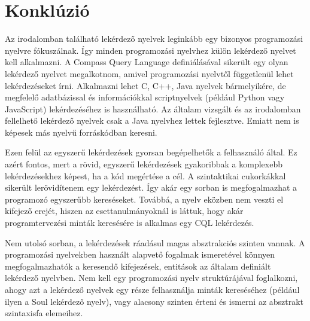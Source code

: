 \documentclass[a4paper,12pt]{report}
\begin{document}
\chapter{Konklúzió}
Az irodalomban található lekérdező nyelvek leginkább egy bizonyos programozási nyelvre fókuszálnak. Így minden programozási nyelvhez külön lekérdező nyelvet kell alkalmazni. A Compass Query Language definiálásával sikerült egy olyan lekérdező nyelvet megalkotnom, amivel programozási nyelvtől függetlenül lehet lekérdezéseket írni. Alkalmazni lehet C, C++, Java nyelvek bármelyikére, de megfelelő adatbázissal és információkkal scriptnyelvek (például Python vagy JavaScript) lekérdezéséhez is használható. Az általam vizsgált és az irodalomban fellelhető lekérdező nyelvek csak a Java nyelvhez lettek fejlesztve. Emiatt nem is képesek más nyelvű forráskódban keresni.
\par Ezen felül az egyszerű lekérdezések gyorsan begépelhetők a felhasználó által. Ez azért fontos, mert a rövid, egyszerű lekérdezések gyakoribbak a komplexebb lekérdezésekhez képest, ha a kód megértése a cél. A szintaktikai cukorkákkal sikerült lerövidítenem egy lekérdezést. Így akár egy sorban is megfogalmazhat a programozó egyszerűbb kereséseket. Továbbá, a nyelv eközben nem veszti el kifejező erejét, hiszen az esettanulmányoknál is láttuk, hogy akár programtervezési minták keresésére is alkalmas egy CQL lekérdezés.
\par Nem utolsó sorban, a lekérdezések ráadásul magas absztrakciós szinten vannak. A programozási nyelvekben használt alapvető fogalmak ismeretével könnyen megfogalmazhatók a keresendő kifejezések, entitások az általam definiált lekérdező nyelvben. Nem kell egy programozási nyelv struktúrájával foglalkozni, ahogy azt a lekérdező nyelvek egy része felhasználja minták kereséséhez (például ilyen a Soul lekérdező nyelv), vagy alacsony szinten érteni és ismerni az absztrakt szintaxisfa elemeihez. 
\end{document}
